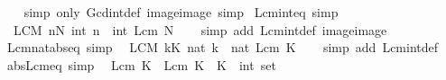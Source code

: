 \begin{isabellebody}
%
\isadelimproof
\ \ %
\endisadelimproof
%
\isatagproof
{}\isamarkupfalse%
\ {\isacharparenleft}{\kern0pt}simp\ only{\isacharcolon}{\kern0pt}\ Gcd{\isacharunderscore}{\kern0pt}int{\isacharunderscore}{\kern0pt}def\ image{\isacharunderscore}{\kern0pt}image{\isacharparenright}{\kern0pt}\ simp%
\endisatagproof
{\isafoldproof}%
%
\isadelimproof
\isanewline
%
\endisadelimproof
\isanewline
{}\isamarkupfalse%
\ Lcm{\isacharunderscore}{\kern0pt}int{\isacharunderscore}{\kern0pt}eq\ {\isacharbrackleft}{\kern0pt}simp{\isacharbrackright}{\kern0pt}{\isacharcolon}{\kern0pt}\isanewline
\ \ {\isachardoublequoteopen}{\isacharparenleft}{\kern0pt}LCM\ n{\isasymin}N{\isachardot}{\kern0pt}\ int\ n{\isacharparenright}{\kern0pt}\ {\isacharequal}{\kern0pt}\ int\ {\isacharparenleft}{\kern0pt}Lcm\ N{\isacharparenright}{\kern0pt}{\isachardoublequoteclose}\isanewline
%
\isadelimproof
\ \ %
\endisadelimproof
%
\isatagproof
{}\isamarkupfalse%
\ {\isacharparenleft}{\kern0pt}simp\ add{\isacharcolon}{\kern0pt}\ Lcm{\isacharunderscore}{\kern0pt}int{\isacharunderscore}{\kern0pt}def\ image{\isacharunderscore}{\kern0pt}image{\isacharparenright}{\kern0pt}%
\endisatagproof
{\isafoldproof}%
%
\isadelimproof
\isanewline
%
\endisadelimproof
\isanewline
{}\isamarkupfalse%
\ Lcm{\isacharunderscore}{\kern0pt}nat{\isacharunderscore}{\kern0pt}abs{\isacharunderscore}{\kern0pt}eq\ {\isacharbrackleft}{\kern0pt}simp{\isacharbrackright}{\kern0pt}{\isacharcolon}{\kern0pt}\isanewline
\ \ {\isachardoublequoteopen}{\isacharparenleft}{\kern0pt}LCM\ k{\isasymin}K{\isachardot}{\kern0pt}\ nat\ {\isasymbar}k{\isasymbar}{\isacharparenright}{\kern0pt}\ {\isacharequal}{\kern0pt}\ nat\ {\isacharparenleft}{\kern0pt}Lcm\ K{\isacharparenright}{\kern0pt}{\isachardoublequoteclose}\isanewline
%
\isadelimproof
\ \ %
\endisadelimproof
%
\isatagproof
{}\isamarkupfalse%
\ {\isacharparenleft}{\kern0pt}simp\ add{\isacharcolon}{\kern0pt}\ Lcm{\isacharunderscore}{\kern0pt}int{\isacharunderscore}{\kern0pt}def{\isacharparenright}{\kern0pt}%
\endisatagproof
{\isafoldproof}%
%
\isadelimproof
\isanewline
%
\endisadelimproof
\isanewline
{}\isamarkupfalse%
\ abs{\isacharunderscore}{\kern0pt}Lcm{\isacharunderscore}{\kern0pt}eq\ {\isacharbrackleft}{\kern0pt}simp{\isacharbrackright}{\kern0pt}{\isacharcolon}{\kern0pt}\isanewline
\ \ {\isachardoublequoteopen}{\isasymbar}Lcm\ K{\isasymbar}\ {\isacharequal}{\kern0pt}\ Lcm\ K{\isachardoublequoteclose}\ \ K\ {\isacharcolon}{\kern0pt}{\isacharcolon}{\kern0pt}\ {\isachardoublequoteopen}int\ set{\isachardoublequoteclose}\isanewline

\end{isabellebody}
